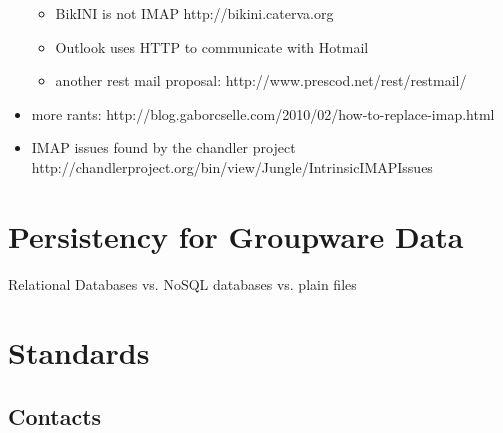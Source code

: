 \documentclass[12pt,a4paper]{scrartcl}		%
\begin{document}
\begin{itemize}
\begin{itemize}
  \item BikINI is not IMAP http://bikini.caterva.org
  \item Outlook uses HTTP to communicate with Hotmail
  \item another rest mail proposal: http://www.prescod.net/rest/restmail/
  \end{itemize}
\item more rants: http://blog.gaborcselle.com/2010/02/how-to-replace-imap.html
\item IMAP issues found by the chandler project http://chandlerproject.org/bin/view/Jungle/IntrinsicIMAPIssues
\end{itemize}

\section{Persistency for Groupware Data}
Relational Databases vs. NoSQL databases vs. plain files

\appendix

\section{Standards}
\subsection{Contacts}
\end{document}
